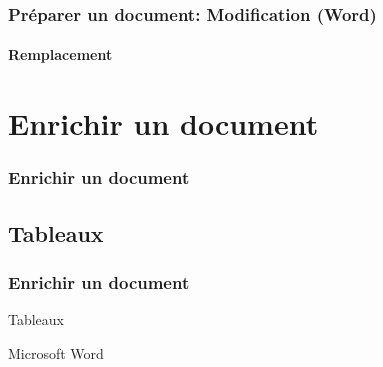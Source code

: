 \documentclass[xcolor=table]{beamer}
\begin{document}
\begin{frame}[t]
\frametitle{Préparer un document: Modification (Word)}
\framesubtitle{Remplacement}

%

\end{frame}

\section{Enrichir un document}

\begin{frame}
\frametitle{Enrichir un document}

\end{frame}

\subsection{Tableaux}

\begin{frame}
\frametitle{Enrichir un document}

\begin{center}
	Tableaux 
	
	Microsoft Word
\end{center}

\end{frame}



\end{document}
